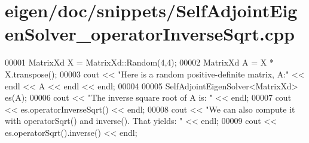 \hypertarget{eigen_2doc_2snippets_2_self_adjoint_eigen_solver__operator_inverse_sqrt_8cpp_source}{}\section{eigen/doc/snippets/\+Self\+Adjoint\+Eigen\+Solver\+\_\+operator\+Inverse\+Sqrt.cpp}
\label{eigen_2doc_2snippets_2_self_adjoint_eigen_solver__operator_inverse_sqrt_8cpp_source}

\begin{DoxyCode}
00001 MatrixXd X = MatrixXd::Random(4,4);
00002 MatrixXd A = X * X.transpose();
00003 cout << \textcolor{stringliteral}{"Here is a random positive-definite matrix, A:"} << endl << A << endl << endl;
00004 
00005 SelfAdjointEigenSolver<MatrixXd> es(A);
00006 cout << \textcolor{stringliteral}{"The inverse square root of A is: "} << endl;
00007 cout << es.operatorInverseSqrt() << endl;
00008 cout << \textcolor{stringliteral}{"We can also compute it with operatorSqrt() and inverse(). That yields: "} << endl;
00009 cout << es.operatorSqrt().inverse() << endl;
\end{DoxyCode}
